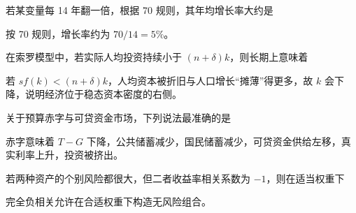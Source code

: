 \begin{question}
若某变量每 14 年翻一倍，根据 70 规则，其年均增长率大约是
\begin{choiceoptions}[2]
\end{choiceoptions}
\begin{solution}
按 70 规则，增长率约为 $70/14=5\%$。
\end{solution}
\end{question}

\begin{question}
在索罗模型中，若实际人均投资持续小于 $(n+\delta)k$，则长期上意味着
\begin{choiceoptions}[2]
\end{choiceoptions}
\begin{solution}
若 $sf(k)<(n+\delta)k$，人均资本被折旧与人口增长“摊薄”得更多，故 $k$ 会下降，说明经济位于稳态资本密度的右侧。
\end{solution}
\end{question}

\begin{question}
关于预算赤字与可贷资金市场，下列说法最准确的是
\begin{choiceoptions}[1]
\end{choiceoptions}
\begin{solution}
赤字意味着 $T-G$ 下降，公共储蓄减少，国民储蓄减少，可贷资金供给左移，真实利率上升，投资被挤出。
\end{solution}
\end{question}

\begin{question}
若两种资产的个别风险都很大，但二者收益率相关系数为 $-1$，则在适当权重下
\begin{choiceoptions}[2]
\end{choiceoptions}
\begin{solution}
完全负相关允许在合适权重下构造无风险组合。
\end{solution}
\end{question}

